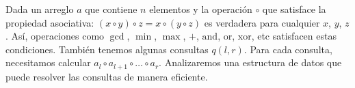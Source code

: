 Dada un arreglo $a$ que contiene $n$ elementos y la operación $\circ$ que satisface la 
propiedad asociativa: $(x \circ y) \circ z=x \circ (y \circ z)$ es verdadera para cualquier $x$, $y$, $z$. Así, operaciones como $\gcd$, $\min$, $\max$, $+$, $\text{and}$, $\text{or}$, $\text{xor}$, etc satisfacen estas condiciones. También tenemos algunas consultas $q(l,r)$. Para cada consulta, necesitamos calcular $a_l\circ a_{l+1}\circ\dots\circ a_r$. Analizaremos una estructura de datos que puede resolver las consultas de manera eficiente.